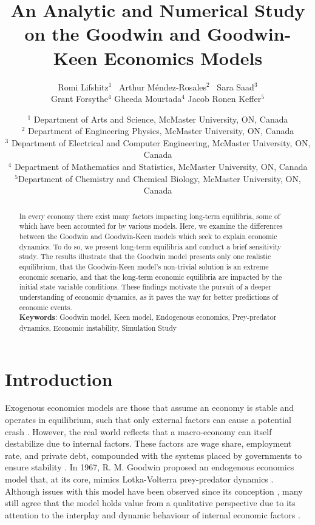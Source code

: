 \documentclass[12pt, centerh1]{article}
\title{An Analytic and Numerical Study on the Goodwin and Goodwin-Keen Economics Models} %
\author{\qquad Romi Lifshitz$^{1}$ \qquad\  Arthur M\'endez-Rosales$^{2}$ \qquad\  Sara Saad$^{3}$ \\ Grant Forsythe$^{4}$ \qquad Gheeda Mourtada$^{4}$ \qquad Jacob Ronen Keffer$^{5}$}
\date{
{\footnotesize $^1$ Department of Arts and Science, McMaster University, ON, Canada\\[-6pt]
$^2$ Department of Engineering Physics, McMaster University, ON, Canada \\[-6pt]
$^3$ Department of Electrical and Computer Engineering, McMaster University, ON, Canada\\[-6pt]
$^4$ Department of Mathematics and Statistics, McMaster University, ON, Canada\\[-6pt]
$^5$Department of Chemistry and Chemical Biology, McMaster University, ON, Canada\\[-6pt]}
}
\begin{document}
\maketitle
\vspace{-8mm} %
\begin{abstract}
In every economy there exist many factors impacting long-term equilibria, some of which have been accounted for by various models. Here, we examine the differences between the Goodwin and Goodwin-Keen models which seek to explain economic dynamics. To do so, we present long-term equilibria and conduct a brief sensitivity study. The results illustrate that the Goodwin model presents only one realistic equilibrium, that the Goodwin-Keen model's non-trivial solution is an extreme economic scenario, and that the long-term economic equilibria are impacted by the initial state variable conditions. These findings motivate the pursuit of a deeper understanding of economic dynamics, as it paves the way for better predictions of economic events. \\ \textbf{Keywords}: Goodwin model, Keen model, Endogenous economics, Prey-predator dynamics, Economic instability, Simulation Study

\end{abstract}
\newpage

\section{Introduction}
\noindent Exogenous economics models are those that assume an economy is stable and operates in equilibrium, such that only external factors can cause a potential crash \citep{ganti_2019}. However, the real world reflects that a macro-economy can itself destabilize due to internal factors. These factors are wage share, employment rate, and private debt, compounded with the systems placed by governments to ensure stability \citep{minsky1992financial}. In 1967, R. M. Goodwin proposed an endogenous economics model that, at its core, mimics Lotka-Volterra prey-predator dynamics \citep{goodwin1982growth}. Although issues with this model have been observed since its conception \citep{harvie2000testing}, many still agree that the model holds value from a qualitative perspective due to its attention to the interplay and dynamic behaviour of internal economic factors \citep{flaschel2016mathematical}. 
\end{document}
